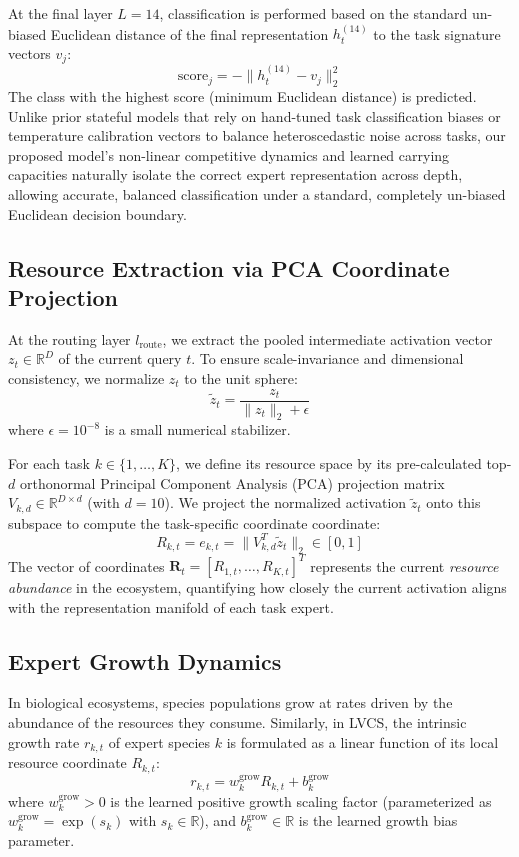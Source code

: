 At the final layer $L = 14$, classification is performed based on the standard un-biased Euclidean distance of the final representation $h_t^{(14)}$ to the task signature vectors $v_j$:
\begin{equation}
    \label{eq:class_rule}
    \text{score}_j = -\|h_t^{(14)} - v_j\|_2^2
\end{equation}
The class with the highest score (minimum Euclidean distance) is predicted. Unlike prior stateful models that rely on hand-tuned task classification biases or temperature calibration vectors to balance heteroscedastic noise across tasks, our proposed model's non-linear competitive dynamics and learned carrying capacities naturally isolate the correct expert representation across depth, allowing accurate, balanced classification under a standard, completely un-biased Euclidean decision boundary.

\subsection{Resource Extraction via PCA Coordinate Projection}
At the routing layer $l_{\text{route}}$, we extract the pooled intermediate activation vector $z_t \in \mathbb{R}^D$ of the current query $t$. To ensure scale-invariance and dimensional consistency, we normalize $z_t$ to the unit sphere:
\begin{equation}
    \tilde{z}_t = \frac{z_t}{\|z_t\|_2 + \epsilon}
\end{equation}
where $\epsilon = 10^{-8}$ is a small numerical stabilizer.

For each task $k \in \{1, \dots, K\}$, we define its resource space by its pre-calculated top-$d$ orthonormal Principal Component Analysis (PCA) projection matrix $V_{k, d} \in \mathbb{R}^{D \times d}$ (with $d = 10$). We project the normalized activation $\tilde{z}_t$ onto this subspace to compute the task-specific coordinate coordinate:
\begin{equation}
    R_{k, t} = e_{k, t} = \|V_{k, d}^T \tilde{z}_t\|_2 \in [0, 1]
\end{equation}
The vector of coordinates $\mathbf{R}_t = [R_{1, t}, \dots, R_{K, t}]^T$ represents the current \emph{resource abundance} in the ecosystem, quantifying how closely the current activation aligns with the representation manifold of each task expert.

\subsection{Expert Growth Dynamics}
In biological ecosystems, species populations grow at rates driven by the abundance of the resources they consume. Similarly, in LVCS, the intrinsic growth rate $r_{k, t}$ of expert species $k$ is formulated as a linear function of its local resource coordinate $R_{k, t}$:
\begin{equation}
    r_{k, t} = w_k^{\text{grow}} R_{k, t} + b_k^{\text{grow}}
\end{equation}
where $w_k^{\text{grow}} > 0$ is the learned positive growth scaling factor (parameterized as $w_k^{\text{grow}} = \exp(s_k)$ with $s_k \in \mathbb{R}$), and $b_k^{\text{grow}} \in \mathbb{R}$ is the learned growth bias parameter.

